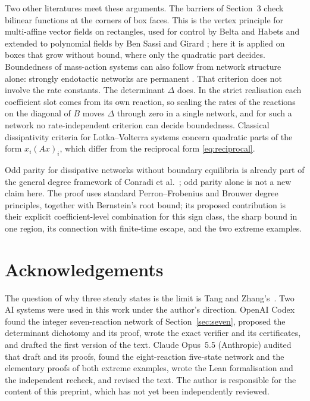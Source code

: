 \documentclass[11pt]{article}
\theoremstyle{remark}\newtheorem{remark}[theorem]{Remark}
\begin{document}
Two other literatures meet these arguments. The barriers of Section~3 check
bilinear functions at the corners of box faces. This is the vertex principle for
multi-affine vector fields on rectangles, used for control by Belta and Habets
\cite{BH} and extended to polynomial fields by Ben Sassi and Girard \cite{BSG};
here it is applied on boxes that grow without bound, where only the quadratic
part decides. Boundedness of mass-action systems can also follow from network
structure alone: strongly endotactic networks are permanent \cite{GMS}. That
criterion does not involve the rate constants. The determinant $\Delta$ does. In the
strict realisation each coefficient slot comes from its own reaction, so scaling
the rates of the reactions on the diagonal of $B$ moves $\Delta$ through zero in a
single network, and for such a network no rate-independent criterion can decide
boundedness. Classical dissipativity criteria for Lotka--Volterra systems
\cite{Takeuchi} concern quadratic parts of the form $x_i(Ax)_i$, which differ from
the reciprocal form \eqref{eq:reciprocal}.

Odd parity for dissipative networks without boundary equilibria is already part
of the general degree framework of Conradi et al.\ \cite{CFMW}; odd parity alone
is not a new claim here.
The proof uses standard Perron--Frobenius and Brouwer degree principles, together
with Bernstein's root bound; its proposed contribution is their explicit
coefficient-level combination for this sign class, the sharp bound in one
region, its connection with finite-time escape, and the two extreme examples.

\section*{Acknowledgements}
The question of why three steady states is the limit is Tang and Zhang's~\cite{TZ}.
Two AI systems were used in this work under the author's direction. OpenAI Codex
found the integer seven-reaction network of Section~\ref{sec:seven}, proposed the
determinant dichotomy and its proof, wrote the exact verifier and its certificates,
and drafted the first version of the text. Claude Opus~5.5 (Anthropic) audited that
draft and its proofs, found the eight-reaction five-state network and the elementary
proofs of both extreme examples, wrote the Lean formalisation and the independent
recheck, and revised the text. The author is responsible for the content of this
preprint, which has not yet been independently reviewed.
\end{document}
